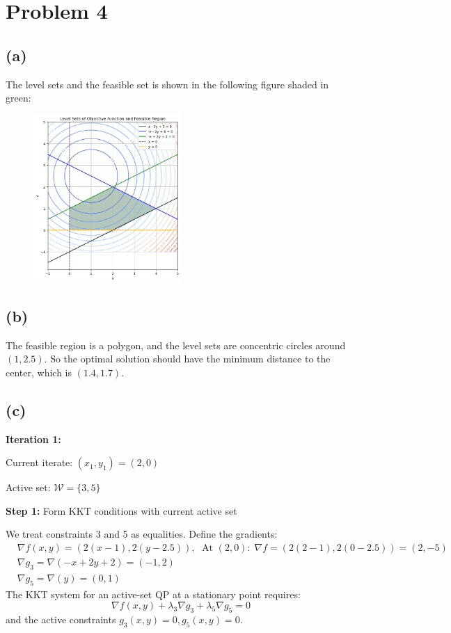\documentclass[12pt]{article}
\begin{document}
\section*{Problem 4}

\subsection*{(a)}

The level sets and the feasible set is shown in the following figure shaded in green:
\begin{figure}[ht]
    \centering
    \includegraphics[width=0.5\textwidth]{./img/contour.png}
\end{figure}

\subsection*{(b)}

The feasible region is a polygon, and the level sets are  concentric circles around $(1,2.5)$. So the optimal solution should have the minimum distance to the center, which is $(1.4,1.7)$.

\subsection*{(c)}

\textbf{\large Iteration 1:}

Current iterate: $(x_1 , y_1) = (2,0)$

Active set: $\mathcal{W} = \{3,5\}$

\textbf{Step 1:} Form KKT conditions with current active set

We treat constraints 3 and 5 as equalities. Define the gradients:
\begin{align*}
        & \nabla f(x, y)=(2(x-1), 2(y-2.5)),\; \text { At }(2,0): \;\nabla f=(2(2-1), 2(0-2.5))=(2,-5) \\
        & \nabla g_3=\nabla(-x+2 y+2)=(-1,2) \\
        & \nabla g_5=\nabla(y)=(0,1)
\end{align*}
The KKT system for an active-set QP at a stationary point requires:
\[
    \nabla f(x, y)+\lambda_3 \nabla g_3+\lambda_5 \nabla g_5=0
\]
and the active constraints $g_3(x, y)=0, g_5(x, y)=0$.
\end{document}

